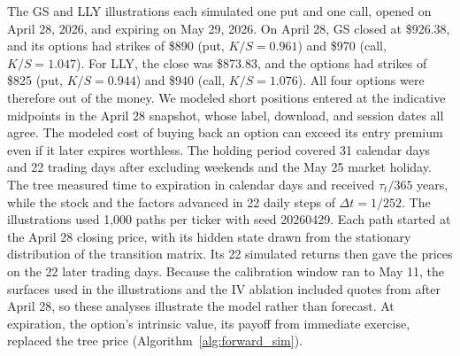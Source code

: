 The GS and LLY illustrations each simulated one put and one call, opened on April 28, 2026, and expiring on May 29, 2026. On April 28, GS closed at \$926.38, and its options had strikes of \$890 (put, $K/S=0.961$) and \$970 (call, $K/S=1.047$). For LLY, the close was \$873.83, and the options had strikes of \$825 (put, $K/S=0.944$) and \$940 (call, $K/S=1.076$). All four options were therefore out of the money. We modeled short positions entered at the indicative midpoints in the April 28 snapshot, whose label, download, and session dates all agree. The modeled cost of buying back an option can exceed its entry premium even if it later expires worthless. The holding period covered 31 calendar days and 22 trading days after excluding weekends and the May 25 market holiday. The tree measured time to expiration in calendar days and received $\tau_t/365$ years, while the stock and the factors advanced in 22 daily steps of $\Delta t=1/252$. The illustrations used 1{,}000 paths per ticker with seed 20260429. Each path started at the April 28 closing price, with its hidden state drawn from the stationary distribution of the transition matrix. Its 22 simulated returns then gave the prices on the 22 later trading days. Because the calibration window ran to May 11, the surfaces used in the illustrations and the IV ablation included quotes from after April 28, so these analyses illustrate the model rather than forecast. At expiration, the option's intrinsic value, its payoff from immediate exercise, replaced the tree price (Algorithm~\ref{alg:forward_sim}).


